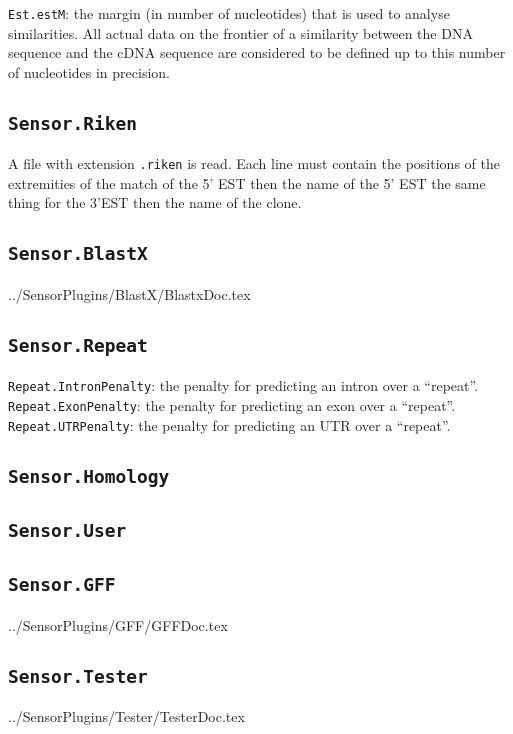 \documentclass[a4paper,titlepage]{report}
\begin{document}
\texttt{Est.estM}: the margin (in number of nucleotides) that is used
to analyse similarities. All actual data on the frontier of a
similarity between the DNA sequence and the cDNA sequence are
considered to be defined up to this number of nucleotides in
precision.


\subsection{\texttt{Sensor.Riken}}
A file with extension \texttt{.riken} is read.  Each line must contain
the positions of the extremities of the match of the 5' EST then the
name of the 5' EST the same thing for the 3'EST then the name of the
clone.


\subsection{\texttt{Sensor.BlastX}}
 {../SensorPlugins/BlastX/BlastxDoc.tex}


\subsection{\texttt{Sensor.Repeat}}

\texttt{Repeat.IntronPenalty}: the penalty for predicting an intron over a
``repeat''.\\
\texttt{Repeat.ExonPenalty}: the penalty for predicting an exon over a
``repeat''.\\
\texttt{Repeat.UTRPenalty}: the penalty for predicting an UTR over a
``repeat''.

\subsection{\texttt{Sensor.Homology}}


\subsection{\texttt{Sensor.User}}
\label{pluguser}


\subsection{\texttt{Sensor.GFF}}
 {../SensorPlugins/GFF/GFFDoc.tex}


\subsection{\texttt{Sensor.Tester}}
 {../SensorPlugins/Tester/TesterDoc.tex}
\end{document}
